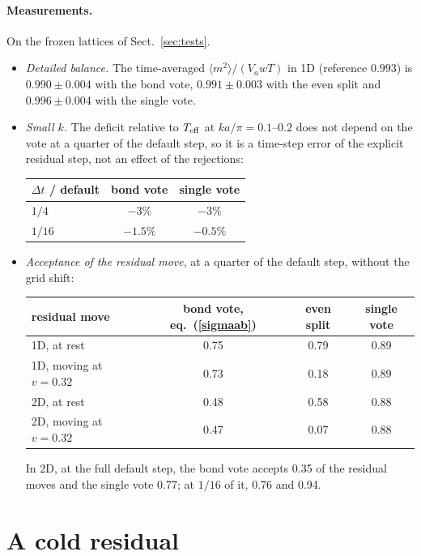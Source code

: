 \documentclass[11pt,aps,preprint,nofootinbib,superscriptaddress,tightenlines]{revtex4-2}
\def\Eq#1{eq.~(\ref{#1})}
\def\Sect#1{Sect.~\ref{#1}}
\newcommand{\avg}[1]{\langle #1\rangle}
\let\oldparagraph\paragraph
\renewcommand{\paragraph}{\par\bigskip\oldparagraph}
\begin{document}
\paragraph{Measurements.}  On the frozen lattices of \Sect{sec:tests}.
\begin{itemize}
\item \emph{Detailed balance.}  The time-averaged $\avg{m^2}/(V_awT)$ in 1D (reference $0.993$) is
  $0.990\pm0.004$ with the bond vote, $0.991\pm0.003$ with the even split and $0.996\pm0.004$ with the
  single vote.
\item \emph{Small $k$.}  The deficit relative to $T_{\rm eff}$ at $ka/\pi=0.1$--$0.2$ does not
  depend on the vote at a quarter of the default step, so it is a time-step error of the explicit
  residual step, not an effect of the rejections:
  \begin{center}
  \begin{tabular}{lcc}
  $\Delta t$ / default & bond vote & single vote \\ \hline
  $1/4$  & $-3\%$   & $-3\%$ \\
  $1/16$ & $-1.5\%$ & $-0.5\%$
  \end{tabular}
  \end{center}
\item \emph{Acceptance of the residual move}, at a quarter of the default step, without the grid shift:
  \begin{center}
  \begin{tabular}{lccc}
  residual move & bond vote, \Eq{sigmaab} & even split & single vote \\ \hline
  1D, at rest            & 0.75 & 0.79 & 0.89 \\
  1D, moving at $v=0.32$ & 0.73 & 0.18 & 0.89 \\
  2D, at rest            & 0.48 & 0.58 & 0.88 \\
  2D, moving at $v=0.32$ & 0.47 & 0.07 & 0.88
  \end{tabular}
  \end{center}
  In 2D, at the full default step, the bond vote accepts 0.35 of the residual moves and the single
  vote 0.77; at $1/16$ of it, 0.76 and 0.94.
\end{itemize}

\section{A cold residual}
\label{app:cold}
\end{document}
